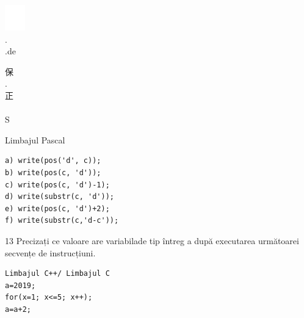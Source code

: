 \documentclass[10pt]{article}
\begin{document}
\includegraphics[max width=\textwidth, center]{2025_04_17_46e04c6acd873ea9558dg-016(3)}\\
.\\
.de

保\\
.\\
正\\
$\qquad$\\
S

Limbajul Pascal

\begin{verbatim}
a) write(pos('d', c));
b) write(pos(c, 'd'));
c) write(pos(c, 'd')-1);
d) write(substr(c, 'd'));
e) write(pos(c, 'd')+2);
f) write(substr(c,'d-c'));
\end{verbatim}

13 Precizați ce valoare are variabilade tip întreg a după executarea următoarei secvențe de instrucțiuni.

\begin{verbatim}
Limbajul C++/ Limbajul C
a=2019;
for(x=1; x<=5; x++);
a=a+2;
\end{verbatim}
\end{document}
